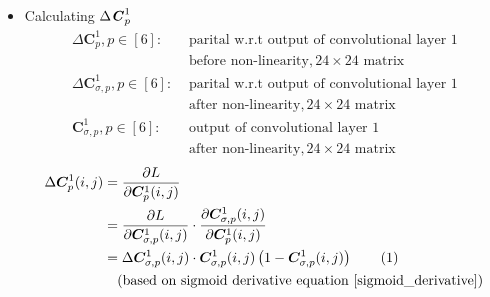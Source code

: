 \documentclass[12pt]{article}
\newcommand\numberthis{\stepcounter{equation}\tag{\theequation}}
\begin{document}
\begin{itemize}
\item Calculating $\Delta \textbf{\textit{C}}_{p}^1$
\begin{align*}
    \Delta \bm{C}_{p}^1, p \in [6]:& \text{ parital w.r.t output of convolutional layer 1} \\& \text{ before non-linearity}, 24 \times 24 \text{ matrix}\\
    \Delta \bm{C}_{\sigma, p}^1, p \in [6]:& \text{ parital w.r.t output of convolutional layer 1} \\& \text{ after non-linearity}, 24 \times 24 \text{ matrix}\\
    \bm{C}_{\sigma, p}^1, p \in [6]:& \text{ output of convolutional layer 1} \\& \text{ after non-linearity}, 24 \times 24 \text{ matrix}
\end{align*}
\begin{align*}
    \Delta \bm{C}_{p}^1(i, j)
    &= \frac{\partial L}{\partial \bm{C}_{p}^1(i, j)}\\
    &= \frac{\partial L}{\partial \bm{C}_{\sigma, p}^1(i, j)}
    \cdot
    \frac{\partial \bm{C}_{\sigma, p}^1(i, j)}{\partial \bm{C}_{p}^1(i, j)}\\
    &= \Delta \bm{C}_{\sigma, p}^1(i, j)
    \cdot
    \bm{C}_{\sigma, p}^1(i, j)\left(1 - \bm{C}_{\sigma, p}^1(i, j)\right)
    \numberthis \label{delta_C1}
    \\
    &\quad (\text{based on sigmoid derivative equation } \eqref{sigmoid_derivative})
\end{align*}


\end{itemize}
\end{document}

